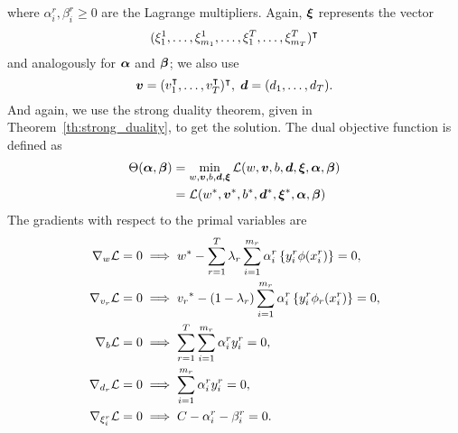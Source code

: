 where $\alpha_i^r, \beta_i^r \geq 0$ are the Lagrange multipliers. Again, $\bm{\xi}$ represents the vector $$(\xi_1^1, \ldots, \xi_{m_1}^1, \ldots, \xi_1^T, \ldots, \xi_{m_T}^T)^\intercal$$ and analogously for $\bm{\alpha}$ and $\bm{\beta}$; we also use 
$$ \bm{v} = (v_1^\intercal, \ldots, v_T^\intercal)^\intercal,\; \bm{d} = (d_1, \ldots, d_T).$$
And again, we use the strong duality theorem, given in Theorem~\ref{th:strong_duality}, to get the solution.
The dual objective function is defined as 
\begin{equation}\nonumber
    \begin{aligned}
         \Theta(\bm{\alpha}, \bm{\beta}) &=  \min_{{w}, \bm{v}, b, \bm{d}, \bm{\xi}} \mathcal{L}({w}, \bm{v}, b, \bm{d}, \bm{\xi}, \bm{\alpha}, \bm{\beta}) \\
         &= \mathcal{L}({{w}}^*, {\bm{v}}^*, {b}^*, {\bm{d}}^*, {\bm{\xi}}^*, \bm{\alpha}, \bm{\beta})
    \end{aligned}    
\end{equation}
The gradients with respect to the primal variables are
\begin{align}
    \grad_{{w}} \lagr  = 0  &\implies \optim{{w}} - \sum_{r= 1}^\ntasks \lambda_r \sum_{i=1}^{m_r} {\alpha_i^r} \left\lbrace y_i^r \phi(x_i^r) \right\rbrace = 0 , \label{eq:common_repr_conv} \\
    \grad_{{v}_r} \lagr  = 0 &\implies \optim{{v}_r} - (1 - \lambda_r) \sum_{i=1}^{m_r} {\alpha_i^r} \left\lbrace y_i^r \phi_r(x_i^r) \right\rbrace = 0 , \label{eq:specific_repr_conv} \\
    \grad_{b} \lagr  = 0  &\implies \sum_{r= 1}^T \sum_{i=1}^{m_r} {\alpha_i^r} y_i^r = 0 , \label{eq:specific_eqconstr_conv}  \\
    \grad_{{d}_r} \lagr  = 0 &\implies \sum_{i=1}^{m_r} {\alpha_i^r} y_i^r = 0 , \label{eq:common_eqconstr_conv} \\
    \grad_{\xi_i^r} \lagr  = 0 &\implies C - {\alpha_i^r} - {\beta_i^r} = 0 . \label{eq:xi_feas_conv}
\end{align}
